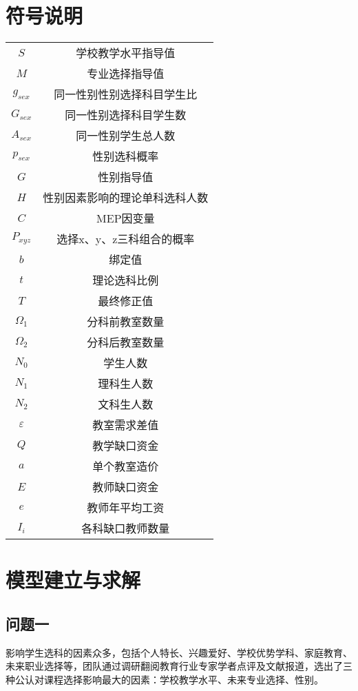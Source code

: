 \documentclass[bwprint]{cumcmthesis}
\begin{document}
\section{符号说明}
\begin{longtable}{cc}
	\toprule
	\makebox[0.4\textwidth][c]{符号}	&  \makebox[0.5\textwidth][c]{意义} \\ \hline
	$S$	    & 学校教学水平指导值\\ %
	$M$	    & 专业选择指导值 \\ %
	$g_{sex}$ & 同一性别性别选择科目学生比 \\ 
	$G_{sex}$ & 同一性别选择科目学生数 \\ 
	$A_{sex}$	& 同一性别学生总人数  \\ 
	$p_{sex}$	& 性别选科概率  \\ 
	$G$	    & 性别指导值 \\ 
	$H$	    & 性别因素影响的理论单科选科人数 \\ 
	$C$	    & MEP因变量 \\ 
	$P_{xyz}$	& 选择x、y、z三科组合的概率 \\ 
	$b$		& 绑定值 \\ 
	$t$		& 理论选科比例  \\ 
	$T$		& 最终修正值 \\ 
	$\Omega_1$&分科前教室数量 \\ 
	$\Omega_2$&分科后教室数量 \\
	$N_0$ &学生人数\\
	$N_1$ &理科生人数\\
	$N_2$ &文科生人数\\
	$\varepsilon$ &教室需求差值\\ 
	$Q$		&教学缺口资金\\
	$a$		&单个教室造价\\
	$E$		&教师缺口资金\\
	$e$		&教师年平均工资\\
	$I_i$	&各科缺口教师数量\\
	\bottomrule
\end{longtable}

\section{模型建立与求解}
\subsection{问题一}
影响学生选科的因素众多，包括个人特长、兴趣爱好、学校优势学科、家庭教育、未来职业选择等，团队通过调研翻阅教育行业专家学者点评及文献报道，选出了三种公认对课程选择影响最大的因素：学校教学水平、未来专业选择、性别。
\end{document}
